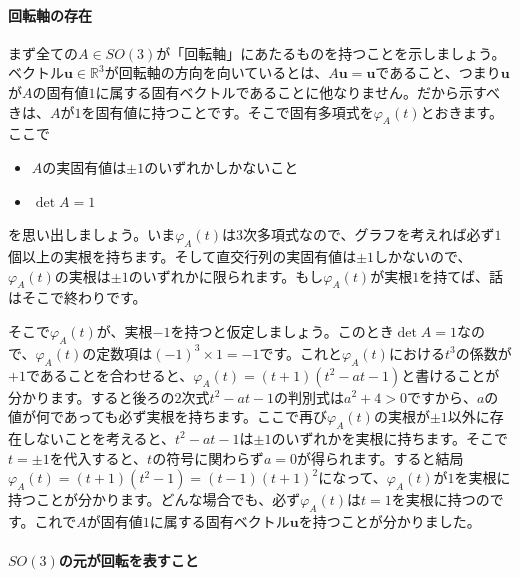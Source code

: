 \paragraph{回転軸の存在}

まず全ての$A \in SO(3)$が「回転軸」にあたるものを持つことを示しましょう。ベクトル$\bm{u} \in \mathbb{R}^3$が回転軸の方向を向いているとは、$A\bm{u} = \bm{u}$であること、つまり$\bm{u}$が$A$の固有値$1$に属する固有ベクトルであることに他なりません。だから示すべきは、$A$が$1$を固有値に持つことです。そこで固有多項式を$\varphi_A(t)$とおきます。ここで
\begin{itemize}
\item $A$の実固有値は$\pm1$のいずれかしかないこと
\item $\det A = 1$
\end{itemize}
を思い出しましょう。いま$\varphi_A(t)$は$3$次多項式なので、グラフを考えれば必ず$1$個以上の実根を持ちます。そして直交行列の実固有値は$\pm1$しかないので、$\varphi_A(t)$の実根は$\pm1$のいずれかに限られます。もし$\varphi_A(t)$が実根$1$を持てば、話はそこで終わりです。

そこで$\varphi_A(t)$が、実根$-1$を持つと仮定しましょう。このとき$\det A = 1$なので、$\varphi_A(t)$の定数項は$(-1)^3 \times 1 = -1$です。これと$\varphi_A(t)$における$t^3$の係数が$+1$であることを合わせると、$\varphi_A(t) = (t + 1)(t^2 - at - 1)$と書けることが分かります。すると後ろの$2$次式$t^2 - at - 1$の判別式は$a^2 + 4 > 0 $ですから、$a$の値が何であっても必ず実根を持ちます。ここで再び$\varphi_A(t)$の実根が$\pm1$以外に存在しないことを考えると、$t^2 - at - 1$は$\pm1$のいずれかを実根に持ちます。そこで$t = \pm1$を代入すると、$t$の符号に関わらず$a = 0$が得られます。すると結局$\varphi_A(t) = (t + 1)(t^2 - 1) = (t - 1) (t + 1)^2$になって、$\varphi_A(t)$が$1$を実根に持つことが分かります。どんな場合でも、必ず$\varphi_A(t)$は$t = 1$を実根に持つのです。これで$A$が固有値$1$に属する固有ベクトル$\bm{u}$を持つことが分かりました。

\paragraph{$SO(3)$の元が回転を表すこと}

